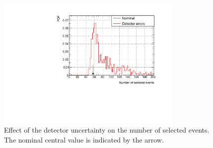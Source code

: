 \begin{figure}[ht]
  \center
  \includegraphics[width=0.8\textwidth]{images/NCg/Det.pdf} 
  \caption[Effect of the detector uncertainty on the number of
  selected events]{Effect of the detector uncertainty on the number of
    selected events. The nominal central value is indicated by the
    arrow.}
  \label{fig:detectorsystematicsinfv}
\end{figure}


